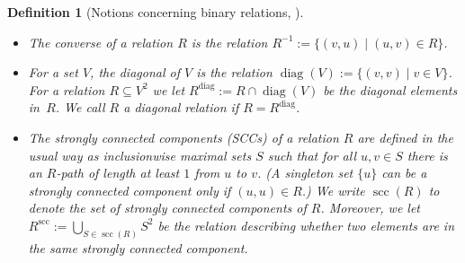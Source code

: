 \documentclass[10pt,a4paper]{article}
\newtheorem{definition}[theorem]{Definition}
\newcommand{\scc}{{\operatorname{scc}}}
\newcommand{\diag}{{\operatorname{diag}}}
\begin{document}
	\begin{definition}[Notions concerning binary relations, \cite{dwl}]
		~\\
		\vspace{-\baselineskip}
		\label{def:PC_binaryRelations}	
		\begin{itemize}
			\item The \emph{converse} of a relation $R$ is the relation $R^{-1}:=\{(v,u)\mid
			(u,v)\in R\}$. 
			\item For a set $V$, the \emph{diagonal} of $V$ is the
			relation $\diag(V):=\{(v,v)\mid v\in V\}$. For a relation $R \subseteq V^2$ we let
			$R^\diag:=R\cap\diag(V)$ be the diagonal elements in~$R$. We call $R$ a \emph{diagonal relation} if $R=R^\diag$.
			\item The \emph{strongly connected components} (\emph{SCC}s) of a relation
			$R$ are defined in the usual way as inclusionwise
			maximal sets $S$ such that for all $u,v\in S$ there is an
			$R$-path of length at least $1$ from $u$ to $v$.
			(A singleton
			set $\{u\}$ can be a strongly connected component only if $(u,u)\in R$.)
			We write $\scc(R)$ to denote the set of strongly connected
			components of $R$. Moreover, we let $R^\scc:=\bigcup_{S\in\scc(R)}S^2$ be the relation describing whether two elements are in the same strongly connected component.
		\end{itemize}
	\end{definition}
	
\end{document}
